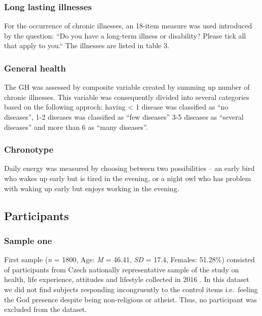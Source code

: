 \documentclass[ijerph,article,accept,moreauthors,pdftex]{mdpi}
\begin{document}
\hypertarget{long-lasting-illnesses}{%
\subsubsection{Long lasting illnesses}\label{long-lasting-illnesses}}

For the occurrence of chronic illnesses, an 18-item measure was used
introduced by the question: ``Do you have a long-term illness or
disability? Please tick all that apply to you.`` The illnesses are
listed in table 3.

\hypertarget{general-health}{%
\subsubsection{General health}\label{general-health}}

The GH was assessed by composite variable created by summing up number
of chronic illnesses. This variable was consequently divided into
several categories based on the following approch: having \textless{} 1
disease was classified as ``no diseases'', 1-2 diseases was classified
as ``few diseases'' 3-5 diseases as ``several diseases'' and more than 6
as ``many diseases''.

\hypertarget{chronotype}{%
\subsubsection{Chronotype}\label{chronotype}}

Daily energy was measured by choosing between two possibilities -- an
early bird who wakes up early but is tired in the evening, or a night
owl who has problem with waking up early but enjoys working in the
evening.

\hypertarget{participants}{%
\subsection{Participants}\label{participants}}

\hypertarget{sample-one}{%
\subsubsection{Sample one}\label{sample-one}}

First sample (\emph{n} = 1800, Age: \emph{M} = 46.41, \emph{SD} = 17.4,
Females: 51.28\%) consisted of participants from Czech nationally
representative sample of the study on health, life experience, attitudes
and lifestyle collected in 2016 \citep{malinakova2020religiosity}. In
this dataset we did not find subjects responding incongruently to the
control items i.e.~feeling the God presence despite being non-religious
or atheist. Thus, no participant was excluded from the dataset.
\end{document}
